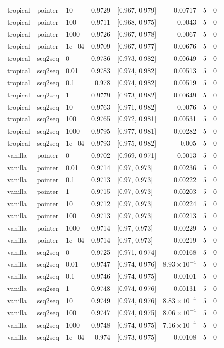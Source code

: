 \documentclass[10pt]{article}
\begin{document}
{\begin{longtable}{lllrlrrr}
tropical & pointer & 10 & 0.9729 & [0.967, 0.979] & 0.00717 & 5 & 0\\
tropical & pointer & 100 & 0.9711 & [0.968, 0.975] & 0.0043 & 5 & 0\\
tropical & pointer & 1000 & 0.9726 & [0.967, 0.978] & 0.0067 & 5 & 0\\
tropical & pointer & 1e+04 & 0.9709 & [0.967, 0.977] & 0.00676 & 5 & 0\\
tropical & seq2seq & 0 & 0.9786 & [0.973, 0.982] & 0.00649 & 5 & 0\\
tropical & seq2seq & 0.01 & 0.9783 & [0.974, 0.982] & 0.00513 & 5 & 0\\
tropical & seq2seq & 0.1 & 0.978 & [0.974, 0.982] & 0.00519 & 5 & 0\\
tropical & seq2seq & 1 & 0.9779 & [0.973, 0.982] & 0.00649 & 5 & 0\\
tropical & seq2seq & 10 & 0.9763 & [0.971, 0.982] & 0.0076 & 5 & 0\\
tropical & seq2seq & 100 & 0.9765 & [0.972, 0.981] & 0.00531 & 5 & 0\\
tropical & seq2seq & 1000 & 0.9795 & [0.977, 0.981] & 0.00282 & 5 & 0\\
tropical & seq2seq & 1e+04 & 0.9793 & [0.975, 0.982] & 0.005 & 5 & 0\\
vanilla & pointer & 0 & 0.9702 & [0.969, 0.971] & 0.0013 & 5 & 0\\
vanilla & pointer & 0.01 & 0.9714 & [0.97, 0.973] & 0.00236 & 5 & 0\\
vanilla & pointer & 0.1 & 0.9713 & [0.97, 0.973] & 0.00222 & 5 & 0\\
vanilla & pointer & 1 & 0.9715 & [0.97, 0.973] & 0.00203 & 5 & 0\\
vanilla & pointer & 10 & 0.9712 & [0.97, 0.973] & 0.00224 & 5 & 0\\
vanilla & pointer & 100 & 0.9713 & [0.97, 0.973] & 0.00213 & 5 & 0\\
vanilla & pointer & 1000 & 0.9714 & [0.97, 0.973] & 0.00229 & 5 & 0\\
vanilla & pointer & 1e+04 & 0.9714 & [0.97, 0.973] & 0.00219 & 5 & 0\\
vanilla & seq2seq & 0 & 0.9725 & [0.971, 0.974] & 0.00168 & 5 & 0\\
vanilla & seq2seq & 0.01 & 0.9747 & [0.974, 0.976] & $8.93\times10^{-4}$ & 5 & 0\\
vanilla & seq2seq & 0.1 & 0.9746 & [0.974, 0.975] & 0.00101 & 5 & 0\\
vanilla & seq2seq & 1 & 0.9748 & [0.974, 0.976] & 0.00131 & 5 & 0\\
vanilla & seq2seq & 10 & 0.9749 & [0.974, 0.976] & $8.83\times10^{-4}$ & 5 & 0\\
vanilla & seq2seq & 100 & 0.9747 & [0.974, 0.975] & $8.06\times10^{-4}$ & 5 & 0\\
vanilla & seq2seq & 1000 & 0.9748 & [0.974, 0.975] & $7.16\times10^{-4}$ & 5 & 0\\
vanilla & seq2seq & 1e+04 & 0.974 & [0.973, 0.975] & 0.00108 & 5 & 0\\
\bottomrule
\end{longtable}
}
\end{document}
